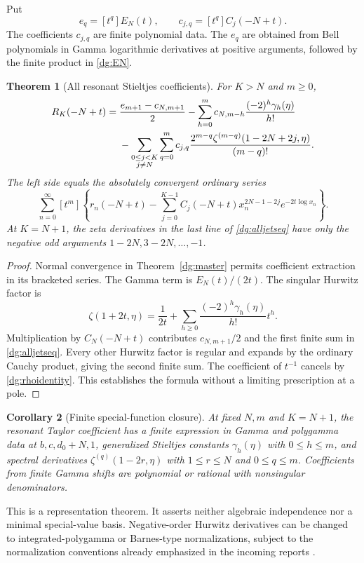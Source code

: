 \documentclass[11pt,a4paper]{article}
\numberwithin{equation}{section}
\newtheorem{theorem}{Theorem}[section]
\newtheorem{corollary}[theorem]{Corollary}
\theoremstyle{definition}
\theoremstyle{remark}
\begin{document}
Put
\begin{equation}\label{dg:jetcoeffs}
 e_q=[t^q]E_N(t),\qquad c_{j,q}=[t^q]C_j(-N+t).
\end{equation}
The coefficients $c_{j,q}$ are finite polynomial data. The $e_q$ are
obtained from Bell polynomials in Gamma logarithmic derivatives at
positive arguments, followed by the finite product in \eqref{dg:EN}.

\begin{theorem}[All resonant Stieltjes coefficients]\label{dg:alljets}
For $K>N$ and $m\ge0$,
\begin{align}
 [t^m]R_K(-N+t)
 ={}&\frac{e_{m+1}-c_{N,m+1}}2
 -\sum_{h=0}^{m}c_{N,m-h}\frac{(-2)^h\gamma_h(\eta)}{h!}
 \notag\\
 &-\sum_{\substack{0\le j<K\\j\ne N}}\sum_{q=0}^{m}
 c_{j,q}\frac{2^{m-q}\zeta^{(m-q)}(1-2N+2j,\eta)}{(m-q)!}.
 \label{dg:alljetseq}
\end{align}
The left side equals the absolutely convergent ordinary series
\begin{equation}\label{dg:jetseries}
 \sum_{n=0}^{\infty}[t^m]\left\{r_n(-N+t)
 -\sum_{j=0}^{K-1}C_j(-N+t)x_n^{2N-1-2j}e^{-2t\log x_n}\right\}.
\end{equation}
At $K=N+1$, the zeta derivatives in the last line of
\eqref{dg:alljetseq} have only the negative odd arguments
$1-2N,3-2N,\ldots,-1$.
\end{theorem}
\begin{proof}
Normal convergence in Theorem~\ref{dg:master} permits coefficient
extraction in its bracketed series. The Gamma term is $E_N(t)/(2t)$.
The singular Hurwitz factor is
\[
 \zeta(1+2t,\eta)=\frac1{2t}
          +\sum_{h\ge0}\frac{(-2)^h\gamma_h(\eta)}{h!}t^h.
\]
Multiplication by $C_N(-N+t)$ contributes
$c_{N,m+1}/2$ and the first finite sum in \eqref{dg:alljetseq}.
Every other Hurwitz factor is regular and expands by the ordinary
Cauchy product, giving the second finite sum. The coefficient of
$t^{-1}$ cancels by \eqref{dg:rhoidentity}. This establishes the
formula without a limiting prescription at a pole.
\end{proof}

\begin{corollary}[Finite special-function closure]\label{dg:closure}
At fixed $N,m$ and $K=N+1$, the resonant Taylor coefficient has a
finite expression in Gamma and polygamma data at $b,c,d_0+N,1$,
generalized Stieltjes constants $\gamma_h(\eta)$ with $0\le h\le m$,
and spectral derivatives $\zeta^{(q)}(1-2r,\eta)$ with
$1\le r\le N$ and $0\le q\le m$. Coefficients from finite Gamma
shifts are polynomial or rational with nonsingular denominators.
\end{corollary}
This is a representation theorem. It asserts neither algebraic
independence nor a minimal special-value basis. Negative-order
Hurwitz derivatives can be changed to integrated-polygamma or
Barnes-type normalizations, subject to the normalization conventions
already emphasized in the incoming reports \cite{incoming-gh,incoming-sh}.
\end{document}
